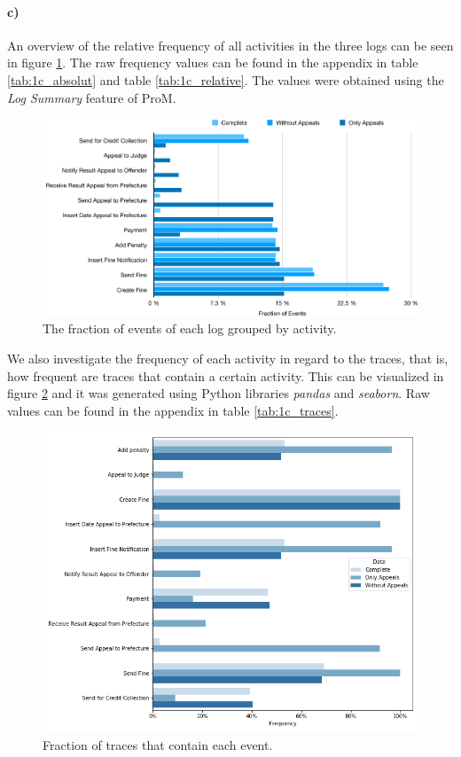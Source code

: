 \documentclass[12pt]{report}
\begin{document}
\paragraph{\textbf{c)}}

An overview of the relative frequency of all activities in the three logs can be seen in figure \ref{fig:activity_frequencies}. The raw frequency values can be found in the appendix in table \ref{tab:1c_absolut} and table \ref{tab:1c_relative}. The values were obtained using the \emph{Log Summary} feature of ProM. 
\begin{figure}[H]
  \centering
  \includegraphics[width=\textwidth]{figures/activity_frequencies.png}
  \caption{The fraction of events of each log grouped by activity.}
  \label{fig:activity_frequencies}
\end{figure}

We also investigate the frequency of each activity in regard to the traces, that is, how frequent are traces that contain a certain activity. This can be visualized in figure \ref{fig:figures-activity_trace_frequencies-png} and it was generated using Python libraries \emph{pandas} and \emph{seaborn}. Raw values can be found in the appendix in table \ref{tab:1c_traces}.

\begin{figure}[H]
    \centering
    \includegraphics[width=\textwidth]{figures/activity_trace_frequencies.png}
    \caption{Fraction of traces that contain each event.}
    \label{fig:figures-activity_trace_frequencies-png}
\end{figure}
\end{document}
